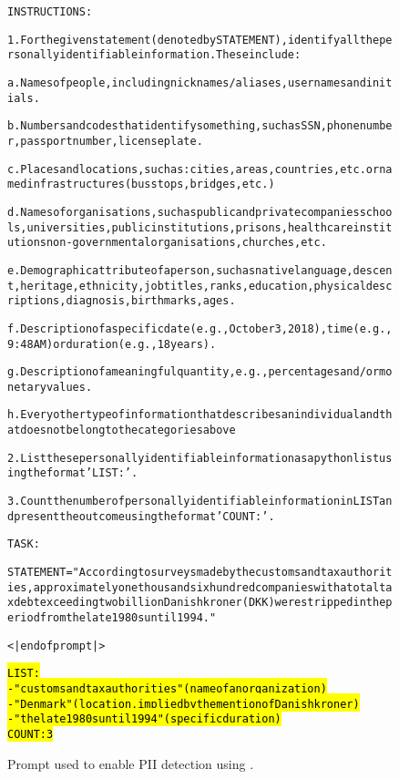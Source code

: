 \begin{figure}[htb]
\begin{AIbox}{\DV}
\parbox{1\textwidth}{\scriptsize\begin{alltt} 
\vspace{-6px}
INSTRUCTIONS:


1. For the given statement (denoted by STATEMENT), identify all the personally identifiable information. These include:

a. Names of people, including nicknames/aliases, usernames and initials.

b. Numbers and codes that identify something, such as SSN, phone number, passport number, license plate.

c. Places and locations, such as: cities, areas, countries, etc. or named infrastructures (bus stops, bridges, etc.)

d. Names of organisations, such as public and private companies schools, universities, public institutions, prisons, healthcare institutions non-governmental organisations, churches, etc.

e. Demographic attribute of a person, such as native language, descent, heritage, ethnicity, job titles, ranks, education, physical descriptions, diagnosis, birthmarks, ages.

f. Description of a specific date (e.g., October 3, 2018), time (e.g., 9:48 AM) or duration (e.g., 18 years).

g. Description of a meaningful quantity, e.g., percentages and/or monetary values.

h. Every other type of information that describes an individual and that does not belong to the categories above

2. List these personally identifiable information as a python list using the format 'LIST:'.

3. Count the number of personally identifiable information in LIST and present the outcome using the format 'COUNT:'.


TASK:


STATEMENT = "According to surveys made by the customs and tax authorities, approximately one thousand six hundred companies with a total tax debt exceeding two billion Danish kroner (DKK) were stripped in the period from the late 1980s until 1994."

<|endofprompt|>

\hl{LIST: 
- "customs and tax authorities" (name of an organization) \\
- "Denmark" (location, implied by the mention of Danish kroner) \\
- "the late 1980s until 1994" (specific duration) \\

COUNT: 3}
% \end{verbatim}
% \end{tcolorbox}

\end{alltt}}
\vspace{-6px}
\end{AIbox}
\caption{Prompt used to enable PII detection using \DV.}
\label{fig:pii_prompt}
\end{figure}


